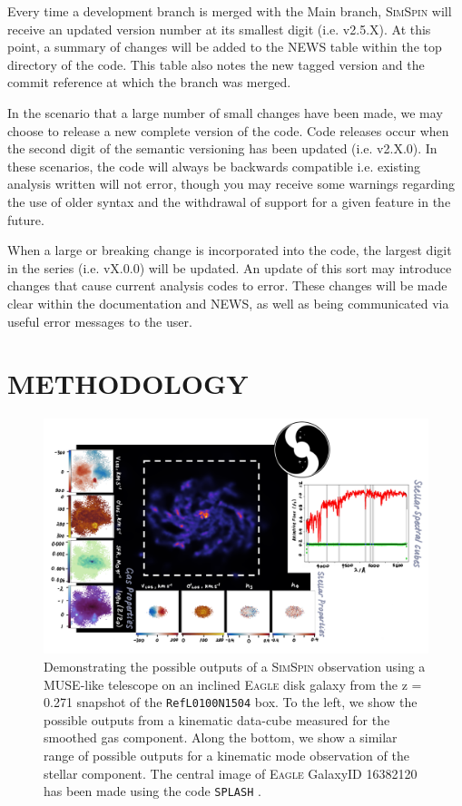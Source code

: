 \documentclass[
  journal=pasa,
  manuscript=research-paper, %
  year=2020,
  volume=37,
]{cup-journal}
\newcommand{\simspin}[1]{\textsc{SimSpin}#1} %
\newcommand{\eagle}[1]{\textsc{Eagle}#1} %
\begin{document}
Every time a development branch is merged with the Main branch, \simspin{} will receive an updated version number at its smallest digit (i.e. v2.5.X).
At this point, a summary of changes will be added to the NEWS table within the top directory of the code.
This table also notes the new tagged version and the commit reference at which the branch was merged.

In the scenario that a large number of small changes have been made, we may choose to release a new complete version of the code. 
Code releases occur when the second digit of the semantic versioning has been updated (i.e. v2.X.0). 
In these scenarios, the code will always be backwards compatible i.e. existing analysis written will not error, though you may receive some warnings regarding the use of older syntax and the withdrawal of support for a given feature in the future. 

When a large or breaking change is incorporated into the code, the largest digit in the series (i.e. vX.0.0) will be updated. 
An update of this sort may introduce changes that cause current analysis codes to error. 
These changes will be made clear within the documentation and NEWS, as well as being communicated via useful error messages to the user. 


\section{METHODOLOGY}

\begin{figure}[ht!]
    \centering
    \includegraphics[keepaspectratio, width=14cm]{Figures/simspin_v25.png}
    \caption{Demonstrating the possible outputs of a \simspin{} observation using a MUSE-like telescope on an inclined \eagle{} disk galaxy from the z = 0.271 snapshot of the \texttt{RefL0100N1504} box. To the left, we show the possible outputs from a kinematic data-cube measured for the smoothed gas component. Along the bottom, we show a similar range of possible outputs for a kinematic mode observation of the stellar component. The central image of \eagle{} GalaxyID 16382120 has been made using the code \texttt{SPLASH} \citep{Price2007Splash}. }
    \label{fig:simspin_v2}
\end{figure}
\end{document}
